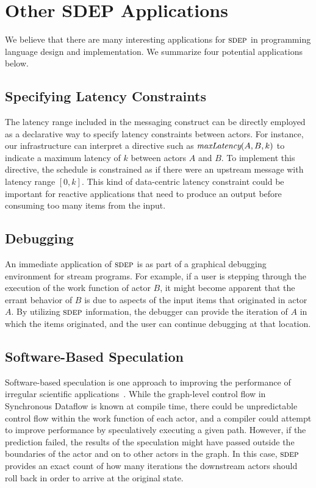 \section{Other SDEP Applications}

We believe that there are many interesting applications for $\textsc{sdep}$ in
programming language design and implementation.  We summarize four
potential applications below.

\subsection{Specifying Latency Constraints}

The latency range included in the messaging construct can be directly
employed as a declarative way to specify latency constraints between
actors.  For instance, our infrastructure can interpret a directive
such as $\mbox{\it maxLatency}(A, B, k)$ to indicate a maximum latency of
$k$ between actors $A$ and $B$.  To implement this directive, the
schedule is constrained as if there were an upstream message with
latency range $[0,k]$.  This kind of data-centric latency constraint
could be important for reactive applications that need to produce an
output before consuming too many items from the input.

\subsection{Debugging}

An immediate application of $\textsc{sdep}$ is as part of a graphical
debugging environment for stream programs.  For example, if a user is
stepping through the execution of the work function of actor $B$, it
might become apparent that the errant behavior of $B$ is due to
aspects of the input items that originated in actor $A$.  By utilizing
$\textsc{sdep}$ information, the debugger can provide the iteration of $A$ in
which the items originated, and the user can continue debugging at
that location.

\subsection{Software-Based Speculation}

Software-based speculation is one approach to improving the
performance of irregular scientific applications~\cite{frank-thesis}.
While the graph-level control flow in Synchronous Dataflow is known at
compile time, there could be unpredictable control flow within the
work function of each actor, and a compiler could attempt to improve
performance by speculatively executing a given path.  However, if the
prediction failed, the results of the speculation might have passed
outside the boundaries of the actor and on to other actors in the
graph.  In this case, $\textsc{sdep}$ provides an exact count of how many
iterations the downstream actors should roll back in order to arrive
at the original state.

